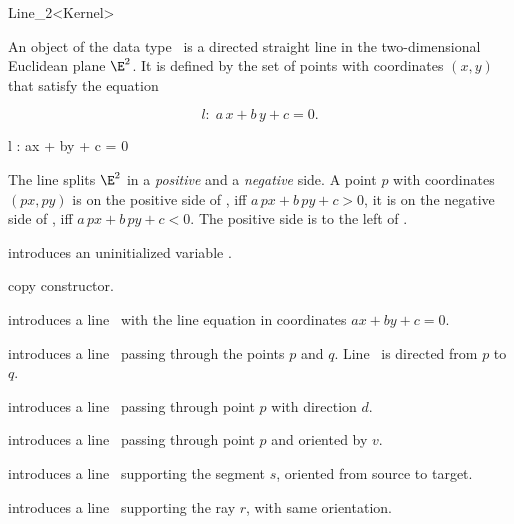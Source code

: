 \begin{ccRefClass} {Line_2<Kernel>}

\ccDefinition
An object  of the data type \ccRefName\ is a directed
straight line in the two-dimensional Euclidean plane $\E^2$. It is
defined by the set of points with  coordinates $(x,y)$ 
that satisfy the equation 
\begin{ccTexOnly}
\[ l:\; a\, x +b\, y +c = 0. \]
\end{ccTexOnly}
\begin{ccHtmlOnly}
 l : ax + by + c = 0 
\end{ccHtmlOnly}
 
The line splits $\E^2$ in a {\em positive} and a {\em negative}
side. A point $p$ with  coordinates 
$(px, py)$ is on the positive side of , iff
$a\, px + b\, py +c > 0$, it is
on the negative side of , iff 
$a\, px + b\, py +c < 0$.
The positive side is to the left of .

\ccCreation
{}

\ccHidden {}
             {introduces an uninitialized variable \ccVar.}

\ccHidden {}
            {copy constructor.}

            {introduces a line \ccVar\ with the line equation in 
              coordinates $ax +by +c = 0$.}

            {introduces a line \ccVar\ passing through the points $p$ and $q$. 
             Line \ccVar\ is directed from $p$ to $q$.}

            {introduces a line \ccVar\ passing through point $p$ with 
             direction $d$.}

            {introduces a line \ccVar\ passing through point $p$ and
             oriented by $v$.}

            {introduces a line \ccVar\ supporting the segment $s$,
            oriented from source to target.}

            {introduces a line \ccVar\ supporting the ray $r$,
            with same orientation.}


\end{ccRefClass}
